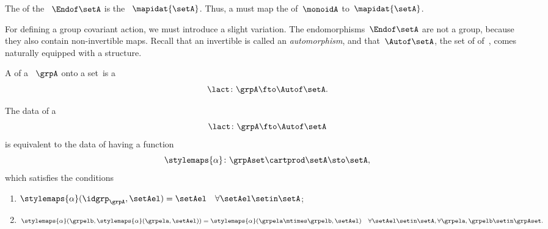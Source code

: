 The  of the ~$\Endof\setA$ is the ~$\mapidat{\setA}$.
Thus, a  must map the  of~$\monoidA$ to~$\mapidat{\setA}$.
%

For defining a group covariant action, we must introduce a slight variation.
The endomorphisms~$\Endof\setA$ are not a group, because they also contain non-invertible maps.
Recall that an invertible  is called an \emph{automorphism}, and that~$\Autof\setA$, the set of  of~\setA, comes naturally equipped with a  structure.


\begin{ctdefinition}
    \label{def:group-cov-action}
    A  of a ~$\grpA$ onto a set~\setA is a 
    \begin{equation}
        \label{eq:act-group}
        \lact \colon \grpA \fto \Autof\setA.
    \end{equation}
\end{ctdefinition}

\begin{lemma}
    \label{lem:uncurrying-group-actions}
    The data of a 
    \begin{equation}
        \lact \colon \grpA \fto \Autof\setA
    \end{equation}
    is equivalent to the data of having a function
    \begin{equation}
        \stylemaps{\alpha} \colon \grpAset \cartprod \setA \sto \setA,
    \end{equation}
    which satisfies the conditions
    \begin{enumerate}
        \item $ \stylemaps{\alpha} (\idgrp_\grpA, \setAel) = \setAel \quad \forall \setAel \setin \setA$;
        \item $ \stylemaps{\alpha} (\grpelb, \stylemaps{\alpha}(\grpela, \setAel)) = \stylemaps{\alpha} (\grpela \mtimes \grpelb, \setAel) \quad \forall \setAel \setin \setA, \forall \grpela, \grpelb \setin \grpAset.
              $
    \end{enumerate}
\end{lemma}

